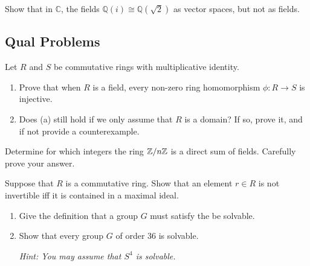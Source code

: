 \begin{problem}[Hungerford 5.1.16]
Show that in $\mathbb{C}$, the fields $\mathbb{Q}(i) \cong \mathbb{Q}(\sqrt 2)$ as vector spaces, but not as fields.
\label{prob:1.1}
\end{problem}

\subsection{Qual Problems}

\begin{problem}
Let $R$ and $S$ be commutative rings with multiplicative identity.

\begin{enumerate}
    \item Prove that when $R$ is a field, every non-zero ring homomorphism $\phi: R\to S$ is injective.
    \item Does (a) still hold if we only assume that $R$ is a domain? If so, prove it, and if not provide a counterexample.
\end{enumerate}
\end{problem}

\begin{problem}
Determine for which integers the ring $\Bbb{Z}/n\Bbb{Z}$ is a direct sum of fields. Carefully prove your answer.
\end{problem}

\begin{problem}
Suppose that $R$ is a commutative ring. Show that an element $r\in R$ is not invertible iff it is contained in a maximal ideal.
\end{problem}

\begin{problem}\hfill

\begin{enumerate}
    \item Give the definition that a group $G$ must satisfy the be solvable.
    \item Show that every group $G$ of order 36 is solvable.
    
    \textit{Hint: You may assume that $S^4$ is solvable.}
\end{enumerate}
\end{problem}